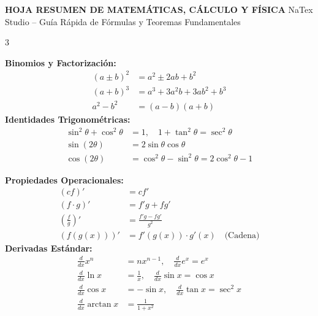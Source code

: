 \documentclass[9pt, letterpaper, landscape]{article}
\begin{document}
\pagestyle{empty}

\begin{center}
  {\large \bfseries \color{primary} HOJA RESUMEN DE MATEMÁTICAS, CÁLCULO Y FÍSICA} \quad
  {\small \color{gray} NaTex Studio -- Guía Rápida de Fórmulas y Teoremas Fundamentales}
\end{center}

\setlength{\columnsep}{0.6cm}
\begin{multicols*}{3}

  \begin{tcolorbox}[title=Álgebra e Identidades Fundamentales, colframe=primary]
    \textbf{Binomios y Factorización:}
    \begin{align*}
      (a \pm b)^2 &= a^2 \pm 2ab + b^2 \\
      (a + b)^3 &= a^3 + 3a^2b + 3ab^2 + b^3 \\
      a^2 - b^2 &= (a - b)(a + b)
    \end{align*}
    \textbf{Identidades Trigonométricas:}
    \begin{align*}
      \sin^2 \theta + \cos^2 \theta &= 1, \quad 1 + \tan^2 \theta = \sec^2 \theta \\
      \sin(2\theta) &= 2\sin\theta\cos\theta \\
      \cos(2\theta) &= \cos^2\theta - \sin^2\theta = 2\cos^2\theta - 1
    \end{align*}
  \end{tcolorbox}

  \begin{tcolorbox}[title=Reglas de Derivación, colframe=darkblue]
    \textbf{Propiedades Operacionales:}
    \begin{align*}
      (cf)' &= c f' \\
      (f \cdot g)' &= f'g + fg' \\
      \left(\frac{f}{g}\right)' &= \frac{f'g - fg'}{g^2} \\
      (f(g(x)))' &= f'(g(x)) \cdot g'(x) \quad \text{(Cadena)}
    \end{align*}
    \textbf{Derivadas Estándar:}
    \begin{align*}
      \frac{d}{dx} x^n &= n x^{n-1}, \quad \frac{d}{dx} e^x = e^x \\
      \frac{d}{dx} \ln x &= \frac{1}{x}, \quad \frac{d}{dx} \sin x = \cos x \\
      \frac{d}{dx} \cos x &= -\sin x, \quad \frac{d}{dx} \tan x = \sec^2 x \\
      \frac{d}{dx} \arctan x &= \frac{1}{1 + x^2}
    \end{align*}
  \end{tcolorbox}


\end{multicols*}
\end{document}

